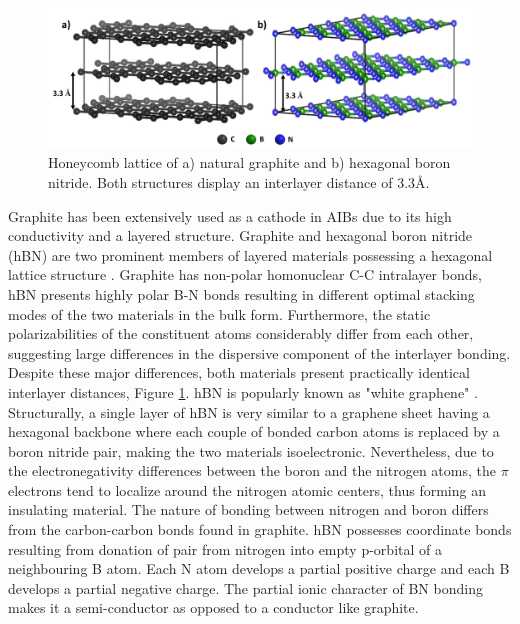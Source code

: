 \begin{figure}[tbh!]
\centering
\includegraphics[width=\textwidth]{Figures/BOhBN/grpBNcomp}
\caption{Honeycomb lattice of a) natural graphite and b) hexagonal boron nitride. Both structures display an interlayer distance of 3.3\AA.}
\label{Figures/BOhBN:grpBNcomp}
\end{figure}

Graphite has been extensively used as a cathode in AIBs due to its high conductivity and a layered structure. Graphite and hexagonal boron nitride (hBN) are two prominent members of layered materials possessing a hexagonal lattice structure \cite{hod_graphite_2012}. Graphite has non-polar homonuclear C-C intralayer bonds, hBN presents highly polar B-N bonds resulting in different optimal stacking modes of the two materials in the bulk form. Furthermore, the static polarizabilities of the constituent atoms considerably differ from each other, suggesting large differences in the dispersive component of the interlayer bonding. Despite these major differences, both materials present practically identical interlayer distances, Figure \ref{Figures/BOhBN:grpBNcomp}. hBN is popularly known as "white graphene" \cite{song_large_2010, zeng_white_2010}. Structurally, a single layer of hBN is very similar to a graphene sheet having a hexagonal backbone where each couple of bonded carbon atoms is replaced by a boron nitride pair, making the two materials isoelectronic. Nevertheless, due to the electronegativity differences between the boron and the nitrogen atoms, the $\pi$ electrons tend to localize around the nitrogen atomic centers, thus forming an insulating material. The nature of bonding between nitrogen and boron differs from the carbon-carbon bonds found in graphite. hBN possesses coordinate bonds resulting from donation of  pair from nitrogen into empty p-orbital of a neighbouring B atom. Each N atom develops a partial positive charge and each B develops a partial negative charge. The partial ionic character of BN bonding makes it a semi-conductor as opposed to a conductor like graphite. 

